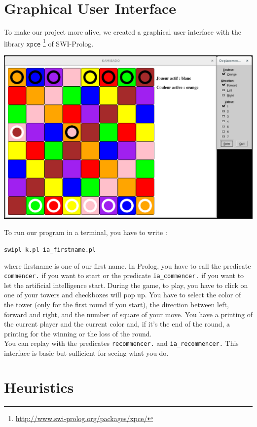 \documentclass[a4paper, 11pt]{article}
\begin{document}
\section{Graphical User Interface}
To make our project more alive, we created a graphical user interface with the library \verb?xpce? \footnote{\url{http://www.swi-prolog.org/packages/xpce/}} of SWI-Prolog.\\
\begin{center}
\includegraphics[scale = 0.30]{kamisado.png}
\end{center}
To run our program in a terminal, you have to write :
\begin{center}
\verb?swipl k.pl ia_firstname.pl?
\end{center}
where firstname is one of our first name. 
In Prolog, you have to call the predicate \verb?commencer.? if you want to start or the predicate \verb?ia_commencer.? if you want to let the artificial intelligence start.
During the game, to play, you have to click on one of your towers and checkboxes will pop up. You have to select the color of the tower (only for the first round if you start), the direction  between left, forward and right, and the number of square of your move.
You have a printing of the current player and the current color and, if it's the end of the round, a printing for the winning or the loss of the round.\\
You can replay with the predicates \verb?recommencer.? and \verb?ia_recommencer.?
This interface is basic but sufficient for seeing what you do.

\section{Heuristics}
\end{document}
